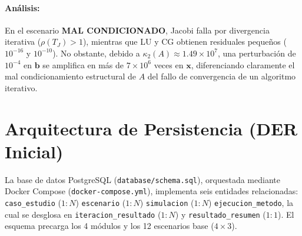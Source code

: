 \documentclass[11pt,a4paper]{article}
\begin{document}
\paragraph{Análisis:} En el escenario \textbf{MAL CONDICIONADO}, Jacobi falla por divergencia iterativa ($\rho(T_J)>1$), mientras que LU y CG obtienen residuales pequeños ($10^{-16}$ y $10^{-10}$). No obstante, debido a $\kappa_2(A) \approx 1.49\times 10^7$, una perturbación de $10^{-4}$ en $\mathbf{b}$ se amplifica en más de $7\times 10^6$ veces en $\mathbf{x}$, diferenciando claramente el mal condicionamiento estructural de $A$ del fallo de convergencia de un algoritmo iterativo.

\section{Arquitectura de Persistencia (DER Inicial)}
La base de datos PostgreSQL (\texttt{database/schema.sql}), orquestada mediante Docker Compose (\texttt{docker-compose.yml}), implementa seis entidades relacionadas: \texttt{caso\_estudio} ($1:N$) \texttt{escenario} ($1:N$) \texttt{simulacion} ($1:N$) \texttt{ejecucion\_metodo}, la cual se desglosa en \texttt{iteracion\_resultado} ($1:N$) y \texttt{resultado\_resumen} ($1:1$). El esquema precarga los 4 módulos y los 12 escenarios base ($4\times 3$).
\end{document}
